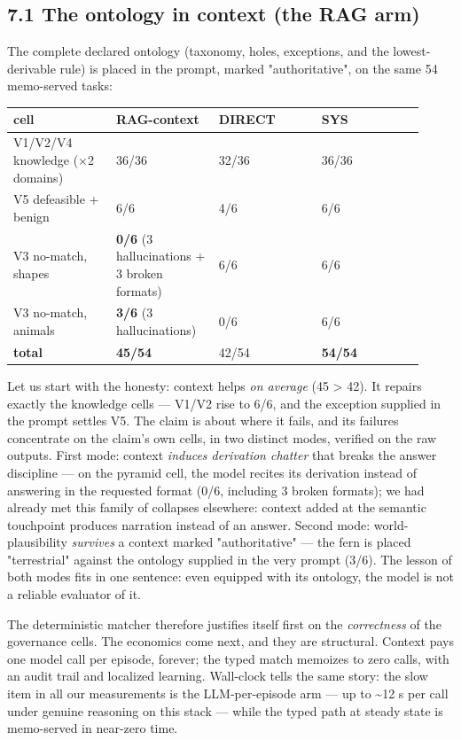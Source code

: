 \documentclass[11pt]{article}
\begin{document}
\subsection*{7.1 The ontology in context (the RAG arm)}

The complete declared ontology (taxonomy, holes, exceptions, and the lowest-derivable rule) is placed in the prompt, marked "authoritative", on the same 54 memo-served tasks:

\begin{center}\small\begin{tabular}{p{0.23\linewidth}p{0.23\linewidth}p{0.23\linewidth}p{0.23\linewidth}}\toprule
cell & RAG-context & DIRECT & SYS \\ \midrule
V1/V2/V4 knowledge (×2 domains) & 36/36 & 32/36 & 36/36 \\
V5 defeasible + benign & 6/6 & 4/6 & 6/6 \\
V3 no-match, shapes & \textbf{0/6} (3 hallucinations + 3 broken formats) & 6/6 & 6/6 \\
V3 no-match, animals & \textbf{3/6} (3 hallucinations) & 0/6 & 6/6 \\
\textbf{total} & \textbf{45/54} & 42/54 & \textbf{54/54} \\
\bottomrule\end{tabular}\end{center}

Let us start with the honesty: context helps \emph{on average} (45 > 42). It repairs exactly the knowledge cells — V1/V2 rise to 6/6, and the exception supplied in the prompt settles V5. The claim is about where it fails, and its failures concentrate on the claim's own cells, in two distinct modes, verified on the raw outputs. First mode: context \emph{induces derivation chatter} that breaks the answer discipline — on the pyramid cell, the model recites its derivation instead of answering in the requested format (0/6, including 3 broken formats); we had already met this family of collapses elsewhere: context added at the semantic touchpoint produces narration instead of an answer. Second mode: world-plausibility \emph{survives} a context marked "authoritative" — the fern is placed "terrestrial" against the ontology supplied in the very prompt (3/6). The lesson of both modes fits in one sentence: even equipped with its ontology, the model is not a reliable evaluator of it.

The deterministic matcher therefore justifies itself first on the \emph{correctness} of the governance cells. The economics come next, and they are structural. Context pays one model call per episode, forever; the typed match memoizes to zero calls, with an audit trail and localized learning. Wall-clock tells the same story: the slow item in all our measurements is the LLM-per-episode arm — up to \textasciitilde{}12 s per call under genuine reasoning on this stack — while the typed path at steady state is memo-served in near-zero time.
\end{document}
